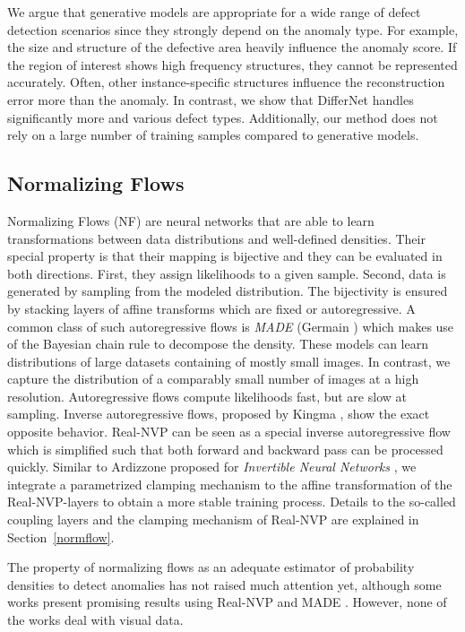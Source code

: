 \documentclass[10pt,twocolumn,letterpaper]{article}
\begin{document}
We argue that generative models are appropriate for a wide range of defect detection scenarios since they strongly depend on the anomaly type.
For example, the size and structure of the defective area heavily influence the anomaly score.
If the region of interest shows high frequency structures, they cannot be represented accurately.
Often, other instance-specific structures influence the reconstruction error more than the anomaly.
In contrast, we show that DifferNet handles significantly more and various defect types. 
Additionally, our method does not rely on a large number of training samples compared to generative models.

\subsection{Normalizing Flows}
Normalizing Flows (NF) \cite{nf} are neural networks that are able to learn transformations between data distributions and well-defined densities.
Their special property is that their mapping is bijective and they can be evaluated in both directions.
First, they assign likelihoods to a given sample.
Second, data is generated by sampling from the modeled distribution.
The bijectivity is ensured by stacking layers of affine transforms which are fixed or autoregressive.
A common class of such autoregressive flows is \textit{MADE} (Germain \etal \cite{germain}) which makes use of the Bayesian chain rule to decompose the density.
These models can learn distributions of large datasets containing of mostly small images.
In contrast, we capture the distribution of a comparably small number of images at a high resolution.
Autoregressive flows compute likelihoods fast, but are slow at sampling.
Inverse autoregressive flows, proposed by Kingma \etal \cite{kingma}, show the exact opposite behavior.
Real-NVP \cite{realnvp} can be seen as a special inverse autoregressive flow which is simplified such that both forward and backward pass can be processed quickly.
Similar to Ardizzone \etal proposed for \textit{Invertible Neural Networks} \cite{cinn}, we integrate a parametrized clamping mechanism to the affine transformation of the Real-NVP-layers to obtain a more stable training process.
Details to the so-called coupling layers and the clamping mechanism of Real-NVP are explained in Section~\ref{normflow}.

The property of normalizing flows as an adequate estimator of probability densities to detect anomalies has not raised much attention yet, although some works present promising results using Real-NVP and MADE \cite{nf_deep, nf_time_series, nf_trajectory}.
However, none of the works deal with visual data.
\end{document}
